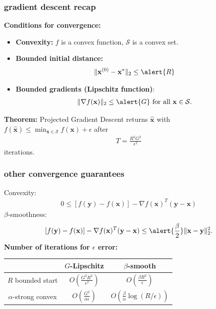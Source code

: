 \documentclass[compress]{beamer}
\newcommand{\bv}[1]{\mathbf{#1}}
\begin{document}
\begin{frame}[t]
	\frametitle{gradient descent recap}
	\textbf{Conditions for convergence:}
	\begin{itemize}
		\item \textbf{Convexity:} $f$ is a convex function, $\mathcal{S}$ is a convex set. 
		\item \textbf{Bounded initial distance:} 
		\begin{align*}
			\|\bv{x}^{(0)} - \bv{x}^*\|_2 \leq \alert{R}
		\end{align*}
		\item \textbf{Bounded gradients (Lipschitz function)}: 
		\begin{align*}
			\|\nabla f(\bv{x})\|_2 \leq \alert{G} \text{ for all } \bv{x}\in \mathcal{S}.
		\end{align*}
	\end{itemize}

\textbf{Theorem:} Projected Gradient Descent returns $\hat{\bv{x}}$ with $f(\hat{\bv{x}}) \leq \min_{\bv{x}\in \mathcal{S}}f(\bv{x})+\epsilon$ after
\begin{align*}
	T = \frac{R^2G^2}{\epsilon^2}
\end{align*}
iterations. 
\end{frame}

\begin{frame}[t]
	\frametitle{other convergence guarantees}
	Convexity: 
	\begin{align*}
		0 \leq \left[f(\bv{y}) - f(\bv{x})\right] - \nabla f(\bv{x})^T(\bv{y} - \bv{x})
	\end{align*}
$\beta$-smoothness:
	\begin{align*}
		\left[f(\bv{y}) - f(\bv{x})\right] - \nabla f(\bv{x})^T(\bv{y} - \bv{x}) \leq \alert{\frac{\beta}{2}}\|\bv{x} - \bv{y}\|_2^2.
	\end{align*}
	\textbf{Number of iterations for $\epsilon$ error:}
\begin{center}
	\begin{tabular}{c|cc}
		& $G$-Lipschitz & $\beta$-smooth   \\ \hline
		$R$ bounded start & $O\left(\frac{G^2R^2}{\epsilon^2}\right)$ & $O\left(\frac{\beta R^2}{\epsilon}\right)$ \\
		$\alpha$-strong convex  & $O\left(\frac{G^2}{\alpha\epsilon}\right)$ & $O\left(\frac{\beta}{\alpha}\log(R/\epsilon)\right)$
	\end{tabular}
\end{center}
\end{frame}
\end{document}
